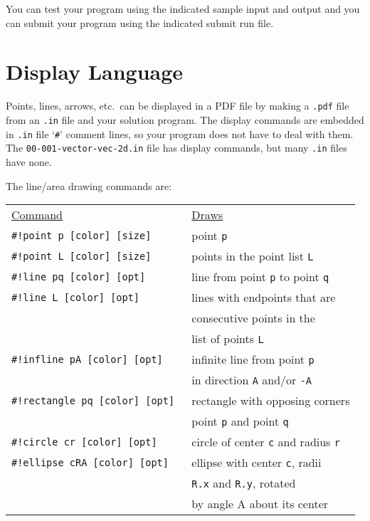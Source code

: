 \documentclass[12pt]{article}
\begin{document}
You can test your program using the indicated sample input and
output and you can submit your program using the indicated submit
run file.

\newpage

\section{Display Language}
Points, lines, arrows, etc.~can be displayed in a PDF file
by making a {\tt .pdf} file from an {\tt .in}
file and your solution program.
The display commands are embedded in {\tt .in} file `{\tt \#}' comment
lines, so your program does not have to deal with them.
The {\tt 00-001-vector-vec-2d.in} file has display commands,
but many {\tt .in} files have none.

\medskip

\begin{minipage}{\textwidth}
The line/area drawing commands are:
\\[1ex]
\begin{tabular}{@{}l@{~~~~~}l@{}}
\underline{Command} & \underline{Draws}
\\[1ex]
\tt \#!point p [color] [size] & point {\tt p} \\
\tt \#!point L [color] [size] & points in the point list {\tt L} \\
\tt \#!line pq [color] [opt] & line from point {\tt p}
                                 to point {\tt q} \\
\tt \#!line L  [color] [opt] & lines with endpoints that are \\
                             & consecutive points in the \\
		             & list of points {\tt L} \\
\tt \#!infline pA [color] [opt] & infinite line from point {\tt p} \\
                                & in direction {\tt A} and/or {\tt -A} \\
\tt \#!rectangle pq [color] [opt] & rectangle with opposing corners \\
                                  & point {\tt p} and point {\tt q} \\
\tt \#!circle cr [color] [opt] & circle of center {\tt c}
                                   and radius {\tt r} \\
\tt \#!ellipse cRA [color] [opt] & ellipse with center {\tt c}, radii \\
                                   & {\tt R.x} and {\tt R.y}, rotated \\
                                   & by angle A about its center \\
\end{tabular}
\end{minipage}
\end{document}

